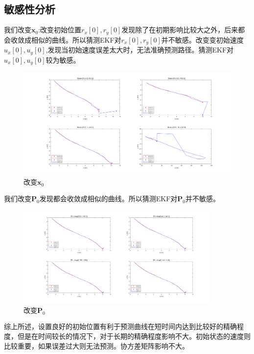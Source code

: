 \documentclass{article}
\begin{document}
\subsection{敏感性分析}
我们改变$\mathbf{x}_0$:改变初始位置$r_x[0],r_y[0]$发现除了在初期影响比较大之外，后来都会收敛成相似的曲线。所以猜测EKF对$r_x[0],r_y[0]$并不敏感。改变变初始速度$u_x[0],u_y[0]$,发现当初始速度误差太大时，无法准确预测路径。猜测EKF对$u_x[0],u_y[0]$较为敏感。
\begin{figure}[ht]
    \centering
    \includegraphics[width = \textwidth]{imgs/comp1.png}
    \caption{改变$\mathbf{x}_0$}
    \label{fig:comp1}
\end{figure}

我们改变$\mathbf{P}_0$发现都会收敛成相似的曲线。所以猜测EKF对$\mathbf{P}_0$并不敏感。
\begin{figure}[ht]
    \centering
    \includegraphics[width = 0.9\textwidth]{imgs/comp2.png}
    \caption{改变$\mathbf{P}_0$}
    \label{fig:comp2}
\end{figure}

综上所述，设置良好的初始位置有利于预测曲线在短时间内达到比较好的精确程度，但是在时间较长的情况下，对于长期的精确程度影响不大。初始状态的速度则比较重要，如果误差过大则无法预测。协方差矩阵影响不大。
\end{document}
